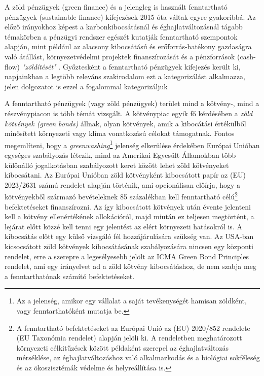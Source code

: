 A zöld pénzügyek (green finance) és a jelengleg is használt fenntartható pénzügyek (sustainable finance) kifejezések 2015 óta váltak egyre gyakoribbá. Az előző irányokhoz képest a karbonkibocsátásnál és éghajlatváltozásnál tágabb témakörben a pénzügyi rendszer egészét kutatják fenntartható szempontok alapján, mint például az alacsony kibocsátású és erőforrás-hatékony gazdaságra való átállást, környezetvédelmi projektek finanszírozását és a pénzforrások (cash-flow) \textit{"zöldítését"} \parencite{sarvari_fenntarthato_2026}. Győztesként a fenntartható pénzügyek kifejezés került ki, napjainkban a legtöbb releváns szakirodalom ezt a kategorizálást alkalmazza, jelen dolgozatot is ezzel a fogalommal kategorizáljuk

A fenntartható pénzügyek (vagy zöld pénzügyek) terület mind a kötvény-, mind a részvénypiacon is több témát vizsgált. A kötvénypiac egyik fő kérdésében a \textit{zöld kötvények (green bonds)} állnak, olyan kötvények, amik a kibocátási értékülből minősített környezeti vagy klíma vonatkozású célokat támogatnak. Fontos megemlíteni, hogy a \textit{greenwashing}\footnote{Az a jelenség, amikor egy vállalat a saját tevékenységét hamisan zöldként, vagy fenntarthatóként mutatja be.} jelenség elkerülése érdekében Európai Unióban egységes szabályozás létezik, mind az Amerikai Egyesült Államokban több különálló jogalkotásban szabályozott keret között lehet zöld kötvényeket kibocsátani. Az Európai Unióban zöld kötvényként kibocsátott papír az (EU) 2023/2631 számú rendelet alapján történik, ami opcionálisan előírja, hogy a kötvényekből származó bevételeknek 85 százalékban kell fenntartható célú\footnote{A fenntartható befektetéseket az Európai Unió az (EU) 2020/852 rendelete (EU Taxonómia rendelet) alapján jelöli ki. A rendeletben meghatározott környezeti célkitűzések között példaként szerepel az éghajlatváltozás mérséklése, az éghajlatváltozáshoz való alkalmazkodás és a biológiai sokféleség és az ökoszisztémák védelme és helyreállítása is.} befektetéseket finanszírozni. Az így kibocsátott kötvények után évente jelenteni kell a kötvény ellenértékének allokációról, majd miután ez teljesen megtörtént, a lejárat előtt közzé kell tenni egy jelentést az elért környezeti hatásokról is. A kibocsátás előtt egy külső vizsgáló fél hozzájárulására szükség van. Az USA-ban kicsocsátott zöld kötvények kibocsátásának szabályozására nincsen egy központi rendelet, erre a szerepre a legesélyesebb jelölt az ICMA Green Bond Principles rendelet, ami egy irányelvet ad a zöld kötvény kibocsátáshoz, de nem szabja meg a fenntarthatónak számító befektetéseket.

